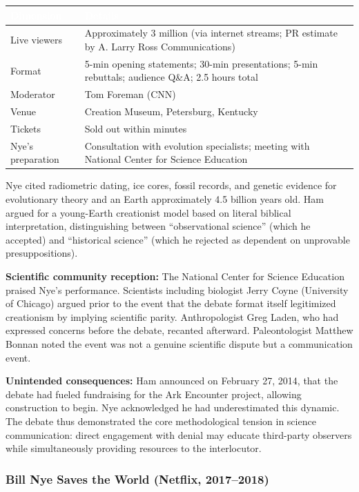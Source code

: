 \documentclass[11pt,letterpaper]{article}
\newcommand{\tableheader}[1]{\textbf{\sffamily\textcolor{white}{#1}}}
\begin{document}
\begin{center}
\begin{tabularx}{\textwidth}{L{3cm}X}
\toprule
{}
\tableheader{Dimension} & \tableheader{Details} \\
\midrule
Live viewers & Approximately 3 million (via internet streams; PR estimate by A. Larry Ross Communications) \\
Format & 5-min opening statements; 30-min presentations; 5-min rebuttals; audience Q\&A; 2.5 hours total \\
Moderator & Tom Foreman (CNN) \\
Venue & Creation Museum, Petersburg, Kentucky \\
Tickets & Sold out within minutes \\
Nye's preparation & Consultation with evolution specialists; meeting with National Center for Science Education \\
\bottomrule
\end{tabularx}
\end{center}

Nye cited radiometric dating, ice cores, fossil records, and genetic evidence for evolutionary theory and an Earth approximately 4.5 billion years old. Ham argued for a young-Earth creationist model based on literal biblical interpretation, distinguishing between ``observational science'' (which he accepted) and ``historical science'' (which he rejected as dependent on unprovable presuppositions).

\textbf{Scientific community reception:} The National Center for Science Education praised Nye's performance. Scientists including biologist Jerry Coyne (University of Chicago) argued prior to the event that the debate format itself legitimized creationism by implying scientific parity. Anthropologist Greg Laden, who had expressed concerns before the debate, recanted afterward. Paleontologist Matthew Bonnan noted the event was not a genuine scientific dispute but a communication event.

\textbf{Unintended consequences:} Ham announced on February 27, 2014, that the debate had fueled fundraising for the Ark Encounter project, allowing construction to begin. Nye acknowledged he had underestimated this dynamic. The debate thus demonstrated the core methodological tension in science communication: direct engagement with denial may educate third-party observers while simultaneously providing resources to the interlocutor.

\subsubsection{Bill Nye Saves the World (Netflix, 2017--2018)}
\end{document}
